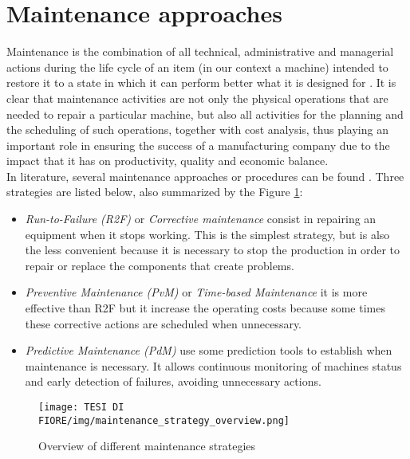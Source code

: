 \section{Maintenance approaches}
Maintenance is the combination of all technical, administrative and managerial actions during the life cycle of an item (in our context a machine) intended to restore it to a state in which it can perform better what it is designed for \cite{4maintenanceTransformation}. It is clear that maintenance activities are not only the physical operations that are needed to repair a particular machine, but also all activities for the planning and the scheduling of such operations, together with cost analysis, thus playing an important role in ensuring the success of a manufacturing company due to the impact that it has on productivity, quality and economic balance.\\
In literature, several maintenance approaches or procedures can be found \cite{3SystematicLiteratureReviewML}. Three strategies are listed below, also summarized by the Figure \ref{maintenance_strategy_overview}:

\begin{itemize}
\item{\textit{Run-to-Failure (R2F)} or \textit{Corrective maintenance} consist in repairing an equipment when it stops working. This is the simplest strategy, but is also the less convenient because it is necessary to stop the production in order to repair or replace the components that create problems.}
\item{\textit{Preventive Maintenance (PvM)} or \textit{Time-based Maintenance} it is more effective than R2F but it increase the operating costs because some times these corrective actions are scheduled when unnecessary.}
\item{\textit{Predictive Maintenance (PdM)} use some prediction tools to establish when maintenance is necessary. It allows continuous monitoring of machines status and early detection of failures, avoiding unnecessary actions.}
\end{itemize}

\begin{figure}[ht]
\texttt{[image: TESI DI FIORE/img/maintenance\_strategy\_overview.png]}
\centering
\caption{Overview of different maintenance strategies \cite{3SystematicLiteratureReviewML}}
\label{maintenance_strategy_overview}
\end{figure}

